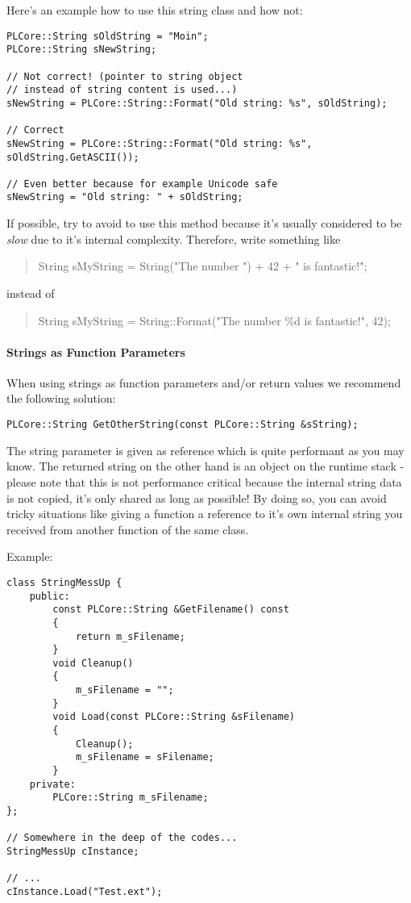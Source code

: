 Here's an example how to use this string class and how not:

\begin{lstlisting}[caption=Valid and invalid string usage example]
PLCore::String sOldString = "Moin";
PLCore::String sNewString;

// Not correct! (pointer to string object
// instead of string content is used...)
sNewString = PLCore::String::Format("Old string: %s", sOldString);

// Correct
sNewString = PLCore::String::Format("Old string: %s", sOldString.GetASCII());

// Even better because for example Unicode safe
sNewString = "Old string: " + sOldString;
\end{lstlisting}

If possible, try to avoid to use this method because it's usually considered to be \emph{slow} due to it's internal complexity. Therefore, write something like
\begin{quote}String sMyString = String("The number ") + 42 + " is fantastic!";\end{quote} instead of \begin{quote}String sMyString = String::Format("The number \%d is fantastic!", 42);\end{quote}


\paragraph{Strings as Function Parameters}
When using strings as function parameters and/or return values we recommend the following solution:

\begin{lstlisting}[caption=String as function parameter and return value]
PLCore::String GetOtherString(const PLCore::String &sString);
\end{lstlisting}

The string parameter is given as reference which is quite performant as you may know. The returned string on the other hand is an object on the runtime stack - please note that this is not performance critical because the internal string data is not copied, it's only shared as long as possible! By doing so, you can avoid tricky situations like giving a function a reference to it's own internal string you received from another function of the same class.

Example:

\begin{lstlisting}[caption=Error prone string usage example]
class StringMessUp {
	public:
		const PLCore::String &GetFilename() const
		{
			return m_sFilename;
		}
		void Cleanup()
		{
			m_sFilename = "";
		}
		void Load(const PLCore::String &sFilename)
		{
			Cleanup();
			m_sFilename = sFilename;
		}
	private:
		PLCore::String m_sFilename;
};

// Somewhere in the deep of the codes...
StringMessUp cInstance;

// ...
cInstance.Load("Test.ext");
\end{lstlisting}

